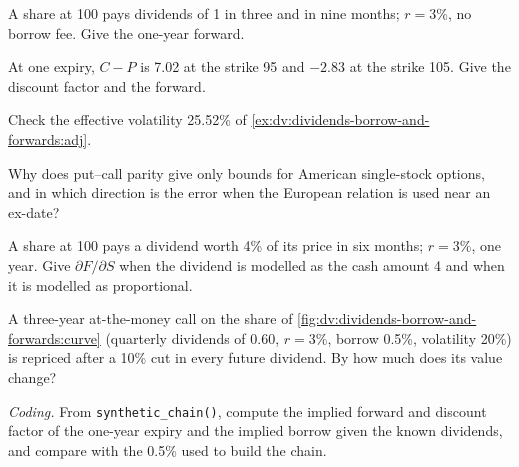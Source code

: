 \begin{exercise}[$\star$]\label{exo:dv:dividends-borrow-and-forwards:1}
A share at 100 pays dividends of 1 in three and in nine months; $r=3\%$, no borrow
fee. Give the one-year forward.
\end{exercise}

\begin{exercise}[$\star$]\label{exo:dv:dividends-borrow-and-forwards:2}
At one expiry, $C-P$ is 7.02 at the strike 95 and $-2.83$ at the strike 105. Give the
discount factor and the forward.
\end{exercise}

\begin{exercise}[$\star$]\label{exo:dv:dividends-borrow-and-forwards:3}
Check the effective volatility 25.52\% of \cref{ex:dv:dividends-borrow-and-forwards:adj}.
\end{exercise}

\begin{exercise}[$\star\star$]\label{exo:dv:dividends-borrow-and-forwards:4}
Why does put--call parity give only bounds for American single-stock options, and in
which direction is the error when the European relation is used near an ex-date?
\end{exercise}

\begin{exercise}[$\star\star$]\label{exo:dv:dividends-borrow-and-forwards:5}
A share at 100 pays a dividend worth 4\% of its price in six months; $r=3\%$, one year.
Give $\partial F/\partial S$ when the dividend is modelled as the cash amount 4 and when
it is modelled as proportional.
\end{exercise}

\begin{exercise}[$\star\star$]\label{exo:dv:dividends-borrow-and-forwards:6}
A three-year at-the-money call on the share of \cref{fig:dv:dividends-borrow-and-forwards:curve}
(quarterly dividends of 0.60, $r=3\%$, borrow 0.5\%, volatility 20\%) is repriced after a
10\% cut in every future dividend. By how much does its value change?
\end{exercise}

\begin{exercise}[$\star\star\star$]\label{exo:dv:dividends-borrow-and-forwards:7}
\emph{Coding.} From \texttt{synthetic\_chain()}, compute the implied forward and
discount factor of the one-year expiry and the implied borrow given the known dividends,
and compare with the 0.5\% used to build the chain.
\end{exercise}

